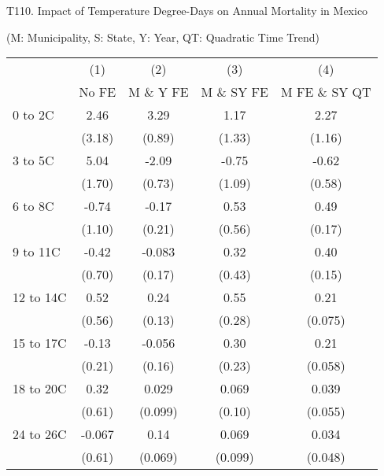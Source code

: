 \documentclass[paper=letterpaper, fontsize=11pt]{article} %
\begin{document}
\begin{center}
T110. Impact of Temperature Degree-Days on Annual Mortality in Mexico

(M: Municipality, S: State, Y: Year, QT: Quadratic Time Trend)
\end{center}

\begin{longtable}{l*{4}{c}} \hline\hline\endfirsthead\hline\endhead\hline\endfoot\endlastfoot
                    &\multicolumn{1}{c}{(1)}&\multicolumn{1}{c}{(2)}&\multicolumn{1}{c}{(3)}&\multicolumn{1}{c}{(4)}\\
                    &\multicolumn{1}{c}{No FE}&\multicolumn{1}{c}{M \& Y FE}&\multicolumn{1}{c}{M \& SY FE}&\multicolumn{1}{c}{M FE \& SY QT}\\
\hline
0 to 2C             &        2.46&        3.29&        1.17&        2.27\\
                    &      (3.18)&      (0.89)&      (1.33)&      (1.16)\\
3 to 5C             &        5.04&       -2.09&       -0.75&       -0.62\\
                    &      (1.70)&      (0.73)&      (1.09)&      (0.58)\\
6 to 8C             &       -0.74&       -0.17&        0.53&        0.49\\
                    &      (1.10)&      (0.21)&      (0.56)&      (0.17)\\
9 to 11C            &       -0.42&      -0.083&        0.32&        0.40\\
                    &      (0.70)&      (0.17)&      (0.43)&      (0.15)\\
12 to 14C           &        0.52&        0.24&        0.55&        0.21\\
                    &      (0.56)&      (0.13)&      (0.28)&     (0.075)\\
15 to 17C           &       -0.13&      -0.056&        0.30&        0.21\\
                    &      (0.21)&      (0.16)&      (0.23)&     (0.058)\\
18 to 20C           &        0.32&       0.029&       0.069&       0.039\\
                    &      (0.61)&     (0.099)&      (0.10)&     (0.055)\\
24 to 26C           &      -0.067&        0.14&       0.069&       0.034\\
                    &      (0.61)&     (0.069)&     (0.099)&     (0.048)\\

\end{longtable}
\end{document}
